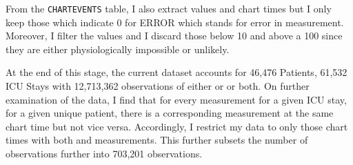 From the \texttt{CHARTEVENTS} table, I also extract \Sp values and chart times but I only keep those which indicate 0 for ERROR which stands for error in measurement.  Moreover, I filter the values and I discard those below 10 and above a 100 since they are either physiologically impossible or unlikely. 

At the end of this stage, the current dataset accounts for 46,476 Patients, 61,532 ICU Stays with 12,713,362 observations of either \Sp or \Fi or both. On further examination of the data, I find that for every \Fi measurement for a given ICU stay, for a given unique patient, there is a corresponding \Sp measurement at the same chart time but not vice versa. Accordingly, I restrict my data to only those chart times with both \Sp and \Fi measurements. This further subsets the number of observations further into 703,201 observations. 

%

